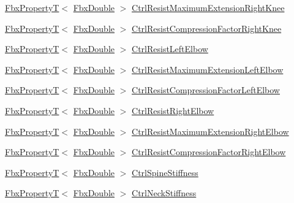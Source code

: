 \begin{DoxyCompactItemize}
\item 
\hyperlink{class_fbx_property_t}{Fbx\+PropertyT}$<$ \hyperlink{fbxtypes_8h_a171e72a1c46fc15c1a6c9c31948c1c5b}{Fbx\+Double} $>$ \hyperlink{class_fbx_character_a3a1f82f2e0f5dc821cc754f6eec3c364}{Ctrl\+Resist\+Maximum\+Extension\+Right\+Knee}
\item 
\hyperlink{class_fbx_property_t}{Fbx\+PropertyT}$<$ \hyperlink{fbxtypes_8h_a171e72a1c46fc15c1a6c9c31948c1c5b}{Fbx\+Double} $>$ \hyperlink{class_fbx_character_af614d06aabafac970336bf6bcdeace0b}{Ctrl\+Resist\+Compression\+Factor\+Right\+Knee}
\item 
\hyperlink{class_fbx_property_t}{Fbx\+PropertyT}$<$ \hyperlink{fbxtypes_8h_a171e72a1c46fc15c1a6c9c31948c1c5b}{Fbx\+Double} $>$ \hyperlink{class_fbx_character_a458ef1c6f23727b7bc6e7c5458cc5cfd}{Ctrl\+Resist\+Left\+Elbow}
\item 
\hyperlink{class_fbx_property_t}{Fbx\+PropertyT}$<$ \hyperlink{fbxtypes_8h_a171e72a1c46fc15c1a6c9c31948c1c5b}{Fbx\+Double} $>$ \hyperlink{class_fbx_character_abbb6f819a06cb579fe43d50d9e495858}{Ctrl\+Resist\+Maximum\+Extension\+Left\+Elbow}
\item 
\hyperlink{class_fbx_property_t}{Fbx\+PropertyT}$<$ \hyperlink{fbxtypes_8h_a171e72a1c46fc15c1a6c9c31948c1c5b}{Fbx\+Double} $>$ \hyperlink{class_fbx_character_a65c4098ee968f0c46fc12bb9cf4f464c}{Ctrl\+Resist\+Compression\+Factor\+Left\+Elbow}
\item 
\hyperlink{class_fbx_property_t}{Fbx\+PropertyT}$<$ \hyperlink{fbxtypes_8h_a171e72a1c46fc15c1a6c9c31948c1c5b}{Fbx\+Double} $>$ \hyperlink{class_fbx_character_a7cfbb020fdafa4044c51dfd2e4bcf708}{Ctrl\+Resist\+Right\+Elbow}
\item 
\hyperlink{class_fbx_property_t}{Fbx\+PropertyT}$<$ \hyperlink{fbxtypes_8h_a171e72a1c46fc15c1a6c9c31948c1c5b}{Fbx\+Double} $>$ \hyperlink{class_fbx_character_a6497c69374b1af8f0d52095d110afda5}{Ctrl\+Resist\+Maximum\+Extension\+Right\+Elbow}
\item 
\hyperlink{class_fbx_property_t}{Fbx\+PropertyT}$<$ \hyperlink{fbxtypes_8h_a171e72a1c46fc15c1a6c9c31948c1c5b}{Fbx\+Double} $>$ \hyperlink{class_fbx_character_af0a8acb958176fece4791944ff171f95}{Ctrl\+Resist\+Compression\+Factor\+Right\+Elbow}
\item 
\hyperlink{class_fbx_property_t}{Fbx\+PropertyT}$<$ \hyperlink{fbxtypes_8h_a171e72a1c46fc15c1a6c9c31948c1c5b}{Fbx\+Double} $>$ \hyperlink{class_fbx_character_af9bb40b8da6dfc8e72c4e5d735cbd1e5}{Ctrl\+Spine\+Stiffness}
\item 
\hyperlink{class_fbx_property_t}{Fbx\+PropertyT}$<$ \hyperlink{fbxtypes_8h_a171e72a1c46fc15c1a6c9c31948c1c5b}{Fbx\+Double} $>$ \hyperlink{class_fbx_character_a1510025642325ad4b31ac1c93be4d690}{Ctrl\+Neck\+Stiffness}

\end{DoxyCompactItemize}
